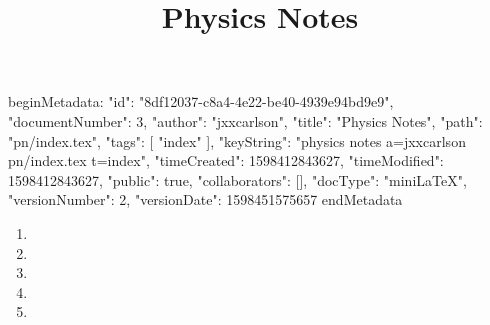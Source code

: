 beginMetadata:
{
    "id": "8df12037-c8a4-4e22-be40-4939e94bd9e9",
    "documentNumber": 3,
    "author": "jxxcarlson",
    "title": "Physics Notes",
    "path": "pn/index.tex",
    "tags": [
        "index"
    ],
    "keyString": "physics notes a=jxxcarlson pn/index.tex t=index",
    "timeCreated": 1598412843627,
    "timeModified": 1598412843627,
    "public": true,
    "collaborators": [],
    "docType": "miniLaTeX",
    "versionNumber": 2,
    "versionDate": 1598451575657
}
endMetadata
\title{Physics Notes}

\maketitle

\begin{enumerate}

\item {}

\item {}

\item {}

\item {}

\item {}


\end{enumerate}
